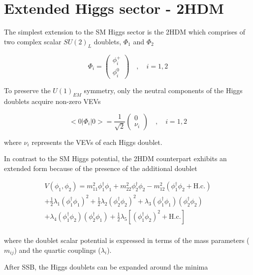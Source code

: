 \section{Extended Higgs sector - 2HDM}

The simplest extension to the SM Higgs sector is the 2HDM which comprises of two complex scalar $SU(2)_L$ doublets, $\Phi_1$ and $\Phi_2$

\begin{equation}
\Phi_i =
\begin{pmatrix}
\phi_i^{+} \\
\phi_i^{0} 
\end{pmatrix}
\quad ,\quad i = 1,2
\end{equation}

To preserve the $U(1)_{EM}$ symmetry, only the neutral components of the Higgs doublets acquire non-zero VEVs

\begin{equation}
    <0|\Phi_i|0> = \frac{1}{\sqrt{2}} \begin{pmatrix}
        0 \\
        \nu_i
    \end{pmatrix} \quad,\quad i=1,2
\end{equation}

where $\nu_i$ represents the VEVs of each Higgs doublet.

In contrast to the SM Higgs potential, the 2HDM counterpart exhibits an extended form because of the presence of the additional doublet

\begin{equation}
\begin{array}{c}
    V(\phi_1,\phi_2) = m_{11}^2 \phi_1^{\dagger}\phi_1 + m_{22}^2 \phi_2^{\dagger}\phi_2 - m_{12}^2(\phi_1^\dagger\phi_2 + \text{H.c.}) \\
    + \frac{1}{2} \lambda_1(\phi_1^\dagger\phi_1)^2 + \frac{1}{2}\lambda_2(\phi_2^\dagger\phi_2)^2 + \lambda_3(\phi_1^\dagger\phi_1)(\phi_2^\dagger\phi_2) \\
    + \lambda_4(\phi_1^\dagger\phi_2)(\phi_2^\dagger\phi_1) + \frac{1}{2}\lambda_5[(\phi_1^\dagger\phi_2)^2 + \text{H.c.}] \\
\end{array}
\end{equation}

where the doublet scalar potential is expressed in terms of the mass parameters ($m_{ij}$) and the quartic couplings ($\lambda_i$).

After SSB, the Higgs doublets can be expanded around the minima


